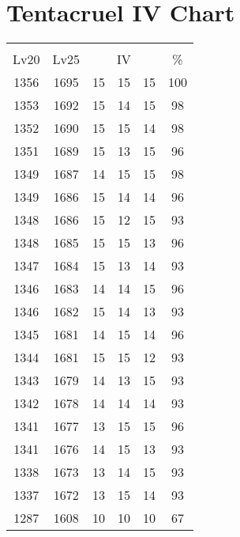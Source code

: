 \documentclass{article}%
\begin{document}
%
\normalsize%
\section{Tentacruel IV Chart}%
\label{sec:Tentacruel IV Chart}%
\renewcommand{\arraystretch}{1.5}%
\begin{tabular}{|c|c|c|c|c|c|}%
\hline%
\multicolumn{6}{|c|}{\textcolor{white}{ 
\linebreak{Tentacruel}
}%
\cellcolor{black}}\\%
\multicolumn{1}{|c}{Lv20}&\multicolumn{1}{c|}{Lv25}&\multicolumn{3}{c|}{IV}&\multicolumn{1}{|c|}{\%}\\%
\hline%
\rowcolor{color100}%
1356&1695&15&15&15&100\\%
\hline%
\rowcolor{color98}%
1353&1692&15&14&15&98\\%
\hline%
\rowcolor{color98}%
1352&1690&15&15&14&98\\%
\hline%
\rowcolor{color96}%
1351&1689&15&13&15&96\\%
\hline%
\rowcolor{color98}%
1349&1687&14&15&15&98\\%
\hline%
\rowcolor{color96}%
1349&1686&15&14&14&96\\%
\hline%
\rowcolor{color93}%
1348&1686&15&12&15&93\\%
\hline%
\rowcolor{color96}%
1348&1685&15&15&13&96\\%
\hline%
\rowcolor{color93}%
1347&1684&15&13&14&93\\%
\hline%
\rowcolor{color96}%
1346&1683&14&14&15&96\\%
\hline%
\rowcolor{color93}%
1346&1682&15&14&13&93\\%
\hline%
\rowcolor{color96}%
1345&1681&14&15&14&96\\%
\hline%
\rowcolor{color93}%
1344&1681&15&15&12&93\\%
\hline%
\rowcolor{color93}%
1343&1679&14&13&15&93\\%
\hline%
\rowcolor{color93}%
1342&1678&14&14&14&93\\%
\hline%
\rowcolor{color96}%
1341&1677&13&15&15&96\\%
\hline%
\rowcolor{color93}%
1341&1676&14&15&13&93\\%
\hline%
\rowcolor{color93}%
1338&1673&13&14&15&93\\%
\hline%
\rowcolor{color93}%
1337&1672&13&15&14&93\\%
\hline%
\rowcolor{color91}%
1287&1608&10&10&10&67\\%
\end{tabular}

%
\end{document}
